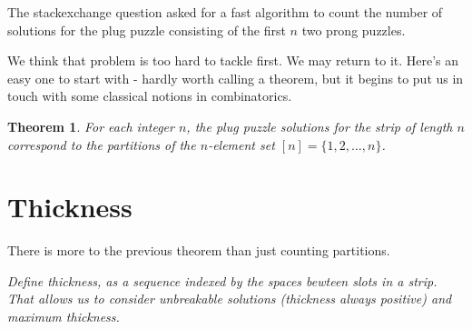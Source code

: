 \documentclass[10pt]{article}
\newtheorem{theorem}{Theorem}
\numberwithin{equation}{section}
\begin{document}
 The stackexchange question asked for a fast algorithm to count the
 number of solutions for the plug puzzle consisting of the first $n$
 two prong puzzles.
 
We think that problem is too  hard to tackle first. We may return to
it.  Here's an easy one to start with - hardly worth calling a
theorem, but it begins to put us in touch with some classical notions
in combinatorics.

\begin{theorem} For each integer $n$, the plug puzzle solutions for
  the strip of length $n$ correspond to the partitions of the
  $n$-element set $[n] = \{1,2, \ldots, n \}$.
\end{theorem}

\section{Thickness}

There is more to the previous theorem than just counting partitions.

\emph{Define thickness, as a sequence indexed by the spaces bewteen
  slots in a strip. That allows us to consider unbreakable solutions
  (thickness always positive) and maximum thickness.}
%
\end{document}
